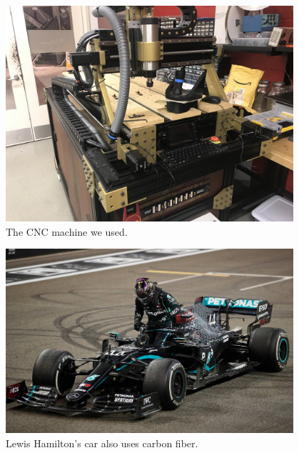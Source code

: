 \begin{figure}[htp]
\centering
\includegraphics[width=0.95\textwidth, angle=0]{Meetings/March/03-14-22/03-14-22 3.JPG}
\caption{The CNC machine we used.}
\label{fig:031022_3}
\end{figure}

\begin{figure}[htp]
\centering
\includegraphics[width=0.95\textwidth, angle=0]{Meetings/March/03-14-22/03-14-22 4.jpg}
\caption{Lewis Hamilton's car also uses carbon fiber.}
\label{fig:031022_4}
\end{figure}







